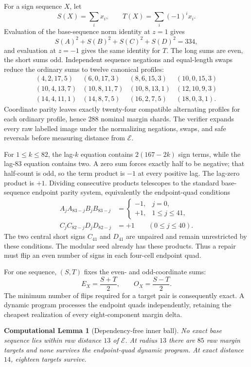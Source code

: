 \documentclass[11pt]{article}
\newtheorem{computationallemma}[theorem]{Computational Lemma}
\begin{document}
For a sign sequence $X$, let
\[
 S(X)=\sum_i x_i,\qquad T(X)=\sum_i(-1)^ix_i.
\]
Evaluation of the base-sequence norm identity at $z=1$ gives
\[
 S(A)^2+S(B)^2+S(C)^2+S(D)^2=334,
\]
and evaluation at $z=-1$ gives the same identity for $T$.
The long sums are even, the short sums odd.  Independent sequence
negations and equal-length swaps reduce the ordinary sums to twelve
canonical profiles:
\[
\begin{array}{rrrr}
(4,2,17,5)&(6,0,17,3)&(8,6,15,3)&(10,0,15,3)\\
(10,4,13,7)&(10,8,11,7)&(10,8,13,1)&(12,10,9,3)\\
(14,4,11,1)&(14,8,7,5)&(16,2,7,5)&(18,0,3,1).
\end{array}
\]
Coordinate parity leaves exactly twenty-four compatible alternating
profiles for each ordinary profile, hence $288$ nominal margin shards.
The verifier expands every raw labelled image under the normalizing
negations, swaps, and safe reversals before measuring distance from
$\mathcal E$.

For $1\le k\le82$, the lag-$k$ equation contains
$2(167-2k)$ sign terms, while the lag-$83$ equation contains two.  A zero
sum forces exactly half to be negative; that half-count is odd, so the term
product is $-1$ at every positive lag.  The lag-zero product is $+1$.
Dividing consecutive products telescopes to the standard base-sequence
endpoint parity system, equivalently the endpoint-quad conditions
\begin{align*}
 A_jA_{83-j}B_jB_{83-j}&=
 \begin{cases}-1,&j=0,\\+1,&1\le j\le41,\end{cases}\\
 C_jC_{82-j}D_jD_{82-j}&=+1
 \qquad(0\le j\le40).
\end{align*}
The two central short signs $C_{41}$ and $D_{41}$ are unpaired and remain
unrestricted by these conditions.
The modular seed already has these products.  Thus a repair must flip an
even number of signs in each four-cell endpoint quad.

For one sequence, $(S,T)$ fixes the even- and odd-coordinate sums:
\[
 E_X=\frac{S+T}{2},\qquad O_X=\frac{S-T}{2}.
\]
The minimum number of flips required for a target pair is consequently
exact.  A dynamic program processes the endpoint quads independently,
retaining the cheapest realization of every eight-component margin delta.

\begin{computationallemma}[Dependency-free inner ball]\label{lem:r13}
No exact base sequence lies within raw distance $13$ of $\mathcal E$.
At radius $13$ there are $85$ raw margin targets and none survives the
endpoint-quad dynamic program.  At exact distance $14$, eighteen targets
survive.
\end{computationallemma}
\end{document}
